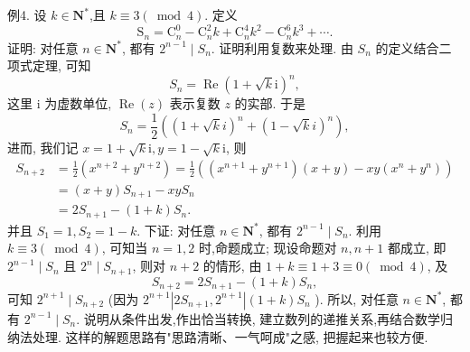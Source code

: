 例4. 设 $k \in \mathbf{N}^*$,且 $k \equiv 3(\bmod 4)$. 定义
$$
\mathrm{S}_n=\mathrm{C}_n^0-\mathrm{C}_n^2 k+\mathrm{C}_n^4 k^2-\mathrm{C}_n^6 k^3+\cdots .
$$
证明: 对任意 $n \in \mathbf{N}^*$, 都有 $2^{n-1} \mid S_n$.
证明利用复数来处理.
由 $S_n$ 的定义结合二项式定理, 可知
$$
S_n=\operatorname{Re}(1+\sqrt{k} \mathrm{i})^n,
$$
这里 $\mathrm{i}$ 为虚数单位, $\operatorname{Re}(z)$ 表示复数 $z$ 的实部.
于是
$$
S_n=\frac{1}{2}\left((1+\sqrt{k} i)^n+(1-\sqrt{k} i)^n\right),
$$
进而, 我们记 $x=1+\sqrt{k} \mathrm{i}, y=1-\sqrt{k} \mathrm{i}$, 则
$$
\begin{aligned}
S_{n+2} & =\frac{1}{2}\left(x^{n+2}+y^{n+2}\right)=\frac{1}{2}\left(\left(x^{n+1}+y^{n+1}\right)(x+y)-x y\left(x^n+y^n\right)\right) \\
& =(x+y) S_{n+1}-x y S_n \\
& =2 S_{n+1}-(1+k) S_n .
\end{aligned}
$$
并且 $S_1=1, S_2=1-k$.
下证: 对任意 $n \in \mathbf{N}^*$, 都有 $2^{n-1} \mid S_n$.
利用 $k \equiv 3(\bmod 4)$, 可知当 $n=1,2$ 时,命题成立; 现设命题对 $n, n+1$ 都成立, 即 $2^{n-1} \mid S_n$ 且 $2^n \mid S_{n+1}$, 则对 $n+2$ 的情形, 由 $1+k \equiv 1+3 \equiv 0 (\bmod 4)$, 及
$$
S_{n+2}=2 S_{n+1}-(1+k) S_n,
$$
可知 $2^{n+1} \mid S_{n+2}$ (因为 $2^{n+1}\left|2 S_{n+1}, 2^{n+1}\right|(1+k) S_n$ ). 所以, 对任意 $n \in \mathbf{N}^*$, 都有 $2^{n-1} \mid S_n$.
说明从条件出发,作出恰当转换, 建立数列的递推关系,再结合数学归纳法处理.
这样的解题思路有"思路清晰、一气呵成"之感, 把握起来也较方便.




